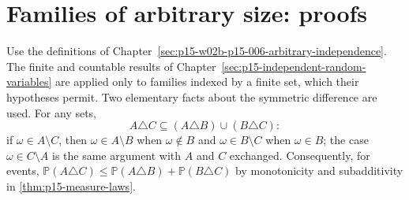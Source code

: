 \section{Families of arbitrary size: proofs}
\label{sec:annex-p15-w02b-p15-006-arbitrary-independence}

Use the definitions of
Chapter~\ref{sec:p15-w02b-p15-006-arbitrary-independence}. The finite
and countable results of
Chapter~\ref{sec:p15-independent-random-variables} are applied only to
families indexed by a finite set, which their hypotheses permit. Two
elementary facts about the symmetric difference are used. For any sets,
\[
 A\triangle C\subseteq(A\triangle B)\cup(B\triangle C):
\]
if \(\omega\in A\setminus C\), then \(\omega\in A\setminus B\) when
\(\omega\notin B\) and \(\omega\in B\setminus C\) when \(\omega\in B\);
the case \(\omega\in C\setminus A\) is the same argument with \(A\) and
\(C\) exchanged. Consequently, for events,
\(\mathbb P(A\triangle C)\leq\mathbb P(A\triangle B)+\mathbb P(B\triangle C)\)
by monotonicity and subadditivity in \cref{thm:p15-measure-laws}.

